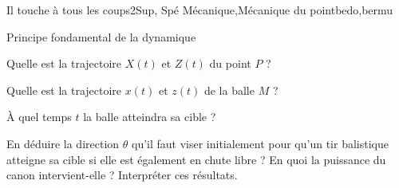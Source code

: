 
\begin{exercise}{Il touche à tous les coups}{2}{Sup, Spé}
{Mécanique,Mécanique du point}{bedo,bermu}

\begin{questions}
\questioncours Principe fondamental de la dynamique


\question Quelle est la trajectoire $X(t)$ et $Z(t)$ du point $P$ ?

\question Quelle est la trajectoire $x(t)$ et $z(t)$ de la balle $M$ ?

\question À quel temps $t$ la balle atteindra sa cible ?

\question En déduire la direction $\theta$ qu'il faut viser initialement pour qu’un tir balistique atteigne sa cible si elle est également en chute libre ? En quoi la puissance du canon intervient-elle ? Interpréter ces résultats.
\end{questions}
\end{exercise}